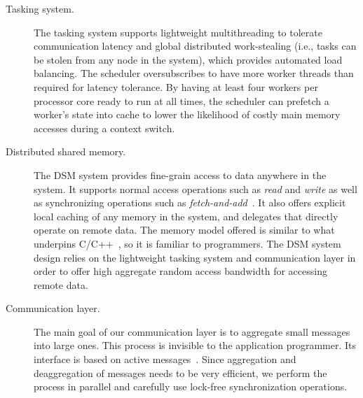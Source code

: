 \begin{description}

\item [Tasking system.] The tasking system supports lightweight multithreading
to tolerate communication latency and global distributed work-stealing (i.e.,
tasks can be stolen from any node in the system), which provides automated
load balancing. The scheduler oversubscribes to have more worker threads than
required for latency tolerance. By having at least four workers per processor
core ready to run at all times, the scheduler can prefetch a worker's state
into cache to lower the likelihood of costly main memory accesses during a
context switch.

\item[Distributed shared memory.] The DSM system provides fine-grain access to
data anywhere in the system. It supports normal access operations such as
\emph{read\/} and \emph{write\/} as well as synchronizing operations such as
\emph{fetch-and-add\/}~\cite{fetchandadd}. It also offers explicit local
caching of any memory in the system, and delegates that directly operate on
remote data. The memory model offered is similar to what underpins
C/C++~\cite{N2480,N2800}, so it is familiar to programmers. The DSM system
design relies on the lightweight tasking system and communication layer in
order to offer high aggregate random access bandwidth for accessing remote
data.

\item[Communication layer.] The main goal of our communication layer is to
aggregate small messages into large ones.  This process is invisible to the application
programmer. Its interface is based on active messages~\cite{vonEicken92}.
Since aggregation and deaggregation of messages needs to be very efficient, we perform the process in parallel and carefully use lock-free synchronization
operations.

\end{description}
